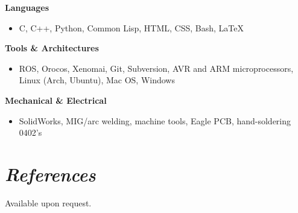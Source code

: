 \documentclass[10pt,letterpaper,margin]{res}
\begin{document}
\begin{resume}
{\bf Languages}\vspace{0.2em}

\begin{itemize}
\item C, C++, Python, Common Lisp,
	  HTML, CSS, Bash, \LaTeX
\end{itemize}

{\bf Tools \& Architectures}\vspace{0.2em}

\begin{itemize}
\item ROS, Orocos, Xenomai,
	  Git, Subversion,
	  AVR and ARM microprocessors,
	  Linux (Arch, Ubuntu), Mac OS, Windows
\end{itemize}

{\bf Mechanical \& Electrical}\vspace{0.2em}

\begin{itemize}
\item SolidWorks, MIG/arc welding, machine tools,
	  Eagle PCB, hand-soldering 0402's
\end{itemize}



\section{\large\itshape References}

Available upon request.

\end{resume}
\end{document}
